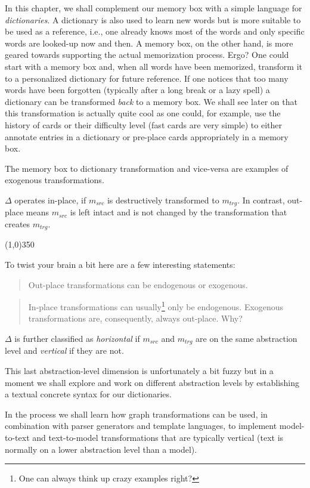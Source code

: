 In this chapter, we shall complement our memory box with a simple language for \emph{dictionaries}.
A dictionary is also used to learn new words but is more suitable to be used as a reference, i.e., one already knows most of the words and only specific words are looked-up now and then.
A memory box, on the other hand, is more geared towards supporting the actual memorization process.
Ergo?  One could start with a memory box and, when all words have been memorized, transform it to a personalized dictionary for future reference.
If one notices that too many words have been forgotten (typically after a long break or a lazy spell) a dictionary can be transformed \emph{back} to a memory box.
We shall see later on that this transformation is actually quite cool as one could, for example, use the history of cards or their difficulty level (fast cards are very simple) to either annotate entries in a dictionary or pre-place cards appropriately in a memory box. 

The memory box to dictionary transformation and vice-versa are examples of exogenous transformations.

$\Delta$ operates in-place, if $m_{src}$ is destructively transformed to $m_{trg}$.
In contrast, out-place means $m_{src}$ is left intact and is not changed by the transformation that creates $m_{trg}$.
 
\vspace{1cm}
\line(1,0){350}
\vspace{1cm}

To twist your brain a bit here are a few interesting statements:
\begin{quote}
Out-place transformations can be endogenous or exogenous.
\end{quote}  
\begin{quote}
In-place transformations can usually\footnote{One can always think up crazy examples right?} only be endogenous.  Exogenous transformations are, consequently, always out-place.  Why? 
\end{quote}  
   
\clearpage
$\Delta$ is further classified as \emph{horizontal} if $m_{src}$ and $m_{trg}$ are on the same abstraction level and \emph{vertical} if they are not. 


This last abstraction-level dimension is unfortunately a bit fuzzy but in a moment we shall explore and work on different abstraction levels by establishing a textual concrete syntax for our dictionaries.

In the process we shall learn how graph transformations can be used, in combination with parser generators and template languages, to implement model-to-text and text-to-model transformations that are typically vertical (text is normally on a lower abstraction level than a model).  

